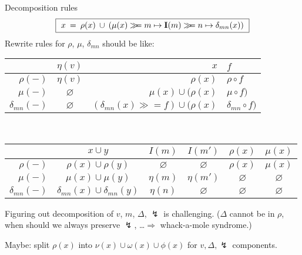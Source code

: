 \documentclass{beamer}
\newcommand{\bind}{\gg\!\!=}
\begin{document}
\begin{frame}{Decomposition rules} %
\[
\fbox{
    $x \: = \: \rho(x) \: \cup \:
        (\mu(x) \bind m \mapsto \mathbf{I}(m) \bind n \mapsto \delta_{mn}(x))$
}
\]
Rewrite rules for $\rho$, $\mu$, $\delta_{mn}$ should be like:
\begin{center}
\small
\begin{tabular}{rcr@{$\:\bind\:$}l}
  \hline
  & $\eta(v)$
  & $x$ & $f$
  \\ \hline
  $\rho(-)$
  & $\eta(v)$
  & $\rho(x)$ & $\rho \circ f$
  \\
  $\mu(-)$
  & $\varnothing$
  & $\mu(x) \cup (\rho(x)$ & $\mu \circ f)$
  \\
  $\delta_{mn}(-)$
  & $\varnothing$
  & $(\delta_{mn}(x) \bind f) \cup (\rho(x)$ & $\delta_{mn} \circ f)$
  \\ \hline
\end{tabular}
\\ \vspace{1em}
\begin{tabular}{rccccc}
  \hline
  & $x \cup y$
  & $I(m)$
  & $I(m')$
  & $\rho(x)$
  & $\mu(x)$
  \\ \hline
  $\rho(-)$
  & $\rho(x) \cup \rho(y)$
  & $\varnothing$
  & $\varnothing$
  & $\rho(x)$
  & $\mu(x)$
  \\
  $\mu(-)$
  & $\mu(x) \cup \mu(y)$
  & $\eta(m)$
  & $\eta(m')$
  & $\varnothing$
  & $\varnothing$
  \\
  $\delta_{mn}(-)$
  & $\delta_{mn}(x) \cup \delta_{mn}(y)$
  & $\eta(n)$
  & $\varnothing$
  & $\varnothing$
  & $\varnothing$
  \\ \hline
\end{tabular}
\end{center}
\vfill

Figuring out decomposition of $v$, $m$, $\Delta$, $\lightning$
is challenging.
($\Delta$ cannot be in $\rho$, when should we always preserve $\lightning$,
\ldots $\Rightarrow$
whack-a-mole syndrome.)
\vfill

Maybe: split $\rho(x)$ into $\nu(x) \cup \omega(x) \cup \phi(x)$
for $v, \Delta, \lightning$ components.

\end{frame}
\end{document}
